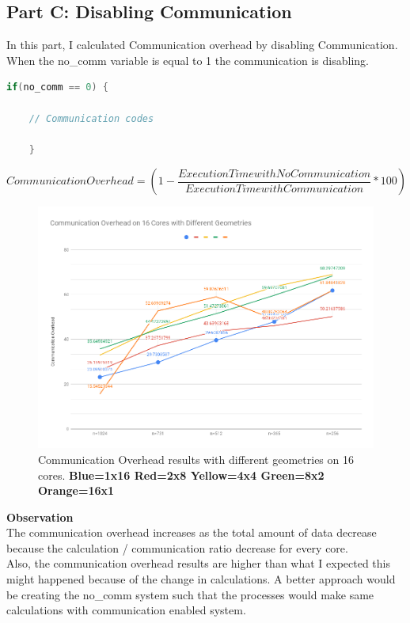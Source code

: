 \documentclass{article}
\newcommand\tab[1][0.5cm]{\hspace*{#1}}
\begin{document}
\subsection{Part C: Disabling Communication}
\tab In this part, I calculated Communication overhead by disabling Communication. When the no\_comm variable is equal to 1 the communication is disabling. 
\begin{lstlisting}[language=C]
    if(no_comm == 0) {

    // Communication codes

    }
\end{lstlisting}
\begin{equation*}
    Communication Overhead  = (1 - \frac{Execution Time with No Communication}{Execution Time with Communication} * 100)
\end{equation*}

\begin{figure}[!htb]
    \centering
    \includegraphics[width=1\linewidth]{./img/comOverhead.png}
    \caption{Communication Overhead results with different geometries on 16 cores. \textbf{Blue=1x16
    Red=2x8 Yellow=4x4 Green=8x2 Orange=16x1}}
\end{figure}  

\textbf{Observation}
\\ \tab The communication overhead increases as the total amount of data decrease because the calculation / communication ratio decrease for every core.
\\ \tab Also, the communication overhead results are higher than what I expected this might happened because of the change in calculations. A better approach would be creating the no\_comm system such that the processes would make same calculations with communication enabled system.
\newpage
\end{document}
